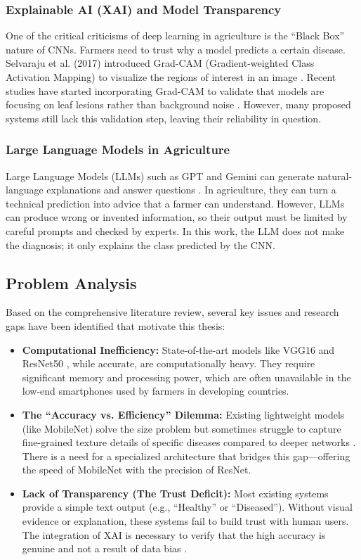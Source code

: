 \subsubsection{Explainable AI (XAI) and Model Transparency}
One of the critical criticisms of deep learning in agriculture is the ``Black Box'' nature of CNNs. Farmers need to trust why a model predicts a certain disease. Selvaraju et al. (2017) introduced Grad-CAM (Gradient-weighted Class Activation Mapping) to visualize the regions of interest in an image \cite{selvaraju2017grad}. Recent studies have started incorporating Grad-CAM to validate that models are focusing on leaf lesions rather than background noise \cite{todros2022explainable}. However, many proposed systems still lack this validation step, leaving their reliability in question.

\subsubsection{Large Language Models in Agriculture}
Large Language Models (LLMs) such as GPT and Gemini can generate natural-language explanations and answer questions \cite{google2026gemini}. In agriculture, they can turn a technical prediction into advice that a farmer can understand. However, LLMs can produce wrong or invented information, so their output must be limited by careful prompts and checked by experts. In this work, the LLM does not make the diagnosis; it only explains the class predicted by the CNN.

\subsection{Problem Analysis}
Based on the comprehensive literature review, several key issues and research gaps have been identified that motivate this thesis:
\begin{itemize}
    \item \textbf{Computational Inefficiency:} State-of-the-art models like VGG16 \cite{ferentinos2018deep} and ResNet50 \cite{he2016deep}, while accurate, are computationally heavy. They require significant memory and processing power, which are often unavailable in the low-end smartphones used by farmers in developing countries.
    \item \textbf{The ``Accuracy vs. Efficiency'' Dilemma:} Existing lightweight models (like MobileNet) solve the size problem but sometimes struggle to capture fine-grained texture details of specific diseases compared to deeper networks \cite{palmer2019mobilenets, too2019comparative}. There is a need for a specialized architecture that bridges this gap---offering the speed of MobileNet with the precision of ResNet.
    \item \textbf{Lack of Transparency (The Trust Deficit):} Most existing systems provide a simple text output (e.g., ``Healthy'' or ``Diseased''). Without visual evidence or explanation, these systems fail to build trust with human users. The integration of XAI is necessary to verify that the high accuracy is genuine and not a result of data bias \cite{todros2022explainable, amara2017deep}.
\end{itemize}

